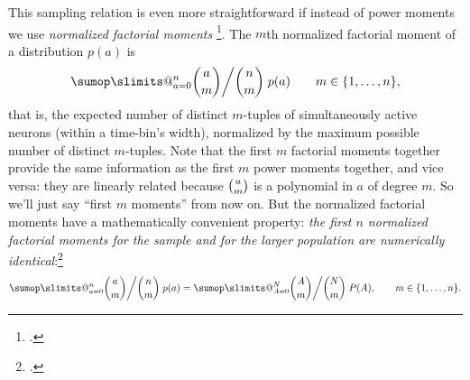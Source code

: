 \documentclass[\ifafour a4paper,12pt,\else a5paper,10pt,\fi%
onecolumn,oneside,article,%
british%
]{memoir}
\makeatletter
\theoremstyle{remark}
\theoremstyle{innote}
\def\sum{\DOTSI\sumop\slimits@}
\newcommand*{\citep}{\footcites}
\newcommand*{\defd}{\coloneqq}
\DeclarePairedDelimiter\set{\{}{\}}
\newcommand*{\E}{\mathrm{E}}
\renewcommand*{\|}{\nonscript\,\vert\nonscript\;\mathopen{}}
\newcommand*{\yAv}{A}
\newcommand*{\yav}{a}
\newcommand*{\ya}{\yav}%
\newcommand*{\yA}{\yAv}%
\newcommand*{\yH}{\varIota}
\newcommand*{\px}{P_{\text{me}}}
\newcommand*{\pxx}{p}
\newcommand*{\pxxx}{P}
\makeatother
\begin{document}
This sampling relation is even more straightforward if instead of power
moments we use \emph{normalized factorial moments} \citep{potts1953}. The
$m$th normalized factorial moment of a distribution $\pxx(\ya)$ is
\begin{equation}
  \label{eq:def_factorial_moment_a}
  \sum_{\ya=0}^{n} %
  \displaystyle\binom{\ya}{m} \bigg/ \binom{n}{m}\; \pxx(\ya)
  \qquad m \in \set{1,\dotsc,n},
\end{equation}
that is, the expected number of distinct $m$-tuples of simultaneously
active neurons (within a time-bin's width), normalized by the maximum
possible number of distinct $m$-tuples. %
Note that the first $m$ factorial moments together provide the same
information as the first $m$ power moments together, and vice versa: they
are linearly related because $\tbinom{\ya}{m}$ is a polynomial in $\ya$ of
degree $m$. So we'll just say \enquote{first $m$ moments} from now
on. %
But the normalized factorial moments have a mathematically convenient
property: \emph{the first $n$ normalized factorial moments for the sample
  and for the larger population are numerically identical}:\citep[Appendix]{portamanaetal2015}
\begin{equation}
  \label{eq:equal_m_factorialmoments}
    \sum_{\ya=0}^{n} %
  \binom{\ya}{m}\bigg/  \binom{n}{m}\; \pxx(\ya)
=    \sum_{\yA=0}^{N} %
  \binom{\yA}{m}\bigg/  \binom{N}{m}\; \pxxx(\yA),\qquad
  m \in \set{1,\dotsc,n}.
\end{equation}
\end{document}
